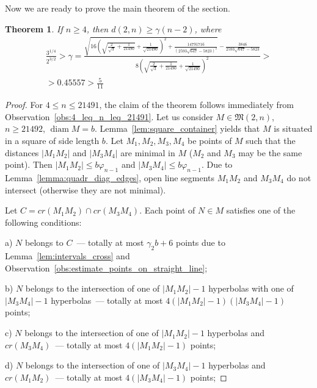 \documentclass[a4paper,14pt]{article} %
\theoremstyle{plain}
\newtheorem{theorem}{Theorem}[section]
\theoremstyle{definition}
\begin{document}
Now we are ready to prove the main theorem of the section.

\begin{theorem}
	\label{thm:main_estimate}
	If $n\geq 4$, then $d(2,n) \geq \gamma (n - 2)$,
	where
	\begin{multline}
		\frac{3^{1/4}}{2^{3/2}} >
		\gamma = \frac{\sqrt{16 {{\left( \sqrt{\frac{2}{\sqrt{3}}+\frac{1}{21490}}+\frac{1}{\sqrt{21490}}\right) }^{2}}+\frac{14791716}{{{\left( 2593 \sqrt{647}-5823\right) }^{2}}}}-\frac{3846}{2593 \sqrt{647}-5823}}{8 {{\left( \sqrt{\frac{2}{\sqrt{3}}+\frac{1}{21490}}+\frac{1}{\sqrt{21490}}\right) }^{2}}}
		>\\
		> 0.45557
		> \frac{5}{11}
	\end{multline}
\end{theorem}

\begin{proof}
	For $4 \leq n \leq 21491$, the claim of the theorem follows immediately from Observation~\ref{obs:4_leq_n_leq_21491}.
	Let us consider $M\in \mathfrak{M}(2,n)$, $n \geq 21492$, $\operatorname{diam} M = b$.
	Lemma~\ref{lem:square_container} yields that $M$ is situated in a square of side length $b$.
	Let $M_1, M_2, M_3, M_4$ be points of $M$ such that the distances $|M_1 M_2|$ and $|M_3 M_4|$
	are minimal in $M$ ($M_2$ and $M_3$ may be the same point).
	Then $|M_1 M_2| \leq b\varphi_{n-1}$ and $|M_3 M_4| \leq b\varphi_{n-1}$.
	Due to Lemma~\ref{lemma:quadr_diag_edges}, open line segments $M_1 M_2$ and $M_3 M_4$ do not intersect
	(otherwise they are not minimal).

	Let $C = cr(M_1 M_2) \cap cr(M_3 M_4)$.
	Each point of $N\in M$ satisfies one of the following conditions:

	a) $N$ belongs to $C$~--- totally at most $\gamma_2 b + 6$ points due to Lemma~\ref{lem:intervals_cross} and Observation~\ref{obs:estimate_points_on_straight_line};

	b) $N$ belongs to the intersection of one of $|M_1 M_2| - 1$ hyperbolas
	with one of $|M_3 M_4| - 1$ hyperbolas~--- totally at most $4 (|M_1 M_2| - 1)(|M_3 M_4| - 1)$ points;

	c) $N$ belongs to the intersection of one of $|M_1 M_2| - 1$ hyperbolas and $cr(M_3 M_4)$~---
	totally at most $4 (|M_1 M_2| - 1)$ points;

	d) $N$ belongs to the intersection of one of $|M_3 M_4| - 1$ hyperbolas and $cr(M_1 M_2)$~---
	totally at most $4 (|M_3 M_4| - 1)$ points;


\end{proof}
\end{document}
